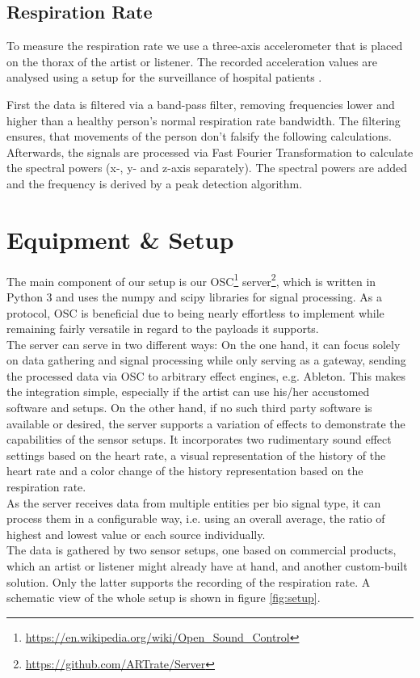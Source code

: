 \documentclass{sigchi-ext}
\begin{document}
\subsection{Respiration Rate}
To measure the respiration rate we use a three-axis accelerometer that is placed on the thorax of the artist or listener. The 
recorded acceleration values are analysed using a setup for the surveillance of hospital patients \cite{kurscheidt2016open}.

First the data is filtered via a band-pass filter, removing frequencies lower and higher than a healthy person's normal
respiration rate bandwidth. The filtering ensures, that movements of the person don't falsify the following calculations. 
Afterwards, the signals are processed via Fast Fourier Transformation to calculate the spectral powers
(x-, y- and z-axis separately). The spectral powers are added and the frequency is derived by a peak detection algorithm.

\section{Equipment \& Setup}

The main component of our setup is our OSC\footnote{\url{https://en.wikipedia.org/wiki/Open_Sound_Control}}
server\footnote{\url{https://github.com/ARTrate/Server}}, which is written in Python 3 and uses the numpy and
scipy libraries for signal processing. As a protocol, OSC is beneficial due to being nearly effortless
to implement while remaining fairly versatile in regard to the payloads it supports. \\
The server can serve in two different ways: On the one hand, it can focus solely on data gathering and signal 
processing while only serving as a gateway, sending the processed data via OSC to arbitrary effect
engines, e.g. Ableton. This makes the integration simple, especially if the artist can use his/her accustomed
software and setups. On the other hand, if no such third party software is available or desired, the server supports a
variation of effects to demonstrate the capabilities of the sensor setups. It incorporates two rudimentary
sound effect settings based on the heart rate, a visual representation of the history of the heart rate
and a color change of the history representation based on the respiration rate.\\
As the server receives data from multiple entities per bio signal type, it can process them in a 
configurable way, i.e. using an overall average, the ratio of highest and lowest value or each source
individually. \\
The data is gathered by two sensor setups, one based on commercial products, which an artist or
listener might already have at hand, and another custom-built solution. Only the latter supports
the recording of the respiration rate. A schematic view of the whole setup is shown in figure \ref{fig:setup}.
\end{document}
